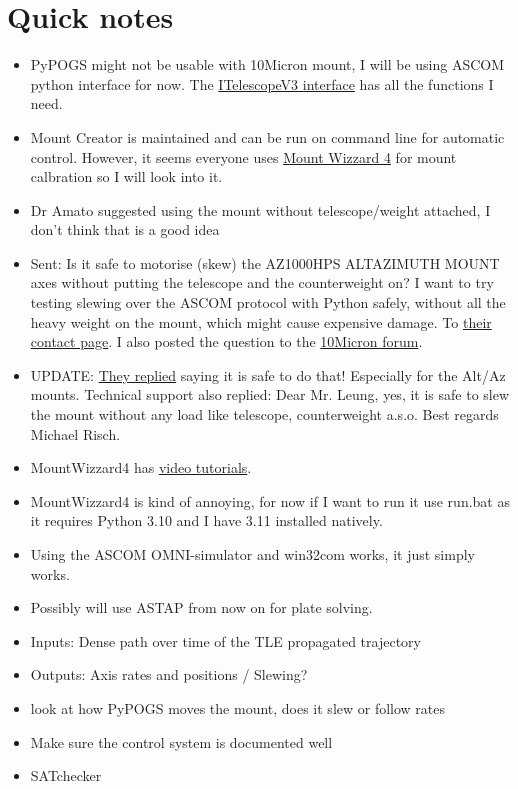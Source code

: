 \documentclass[../main.tex]{subfiles}
\begin{document}
\section{Quick notes}
\begin{itemize}
    \item PyPOGS might not be usable with 10Micron mount, I will be using ASCOM python interface for now. The \href{https://ascom-standards.org/Help/Developer/html/T_ASCOM_DeviceInterface_ITelescopeV3.htm}{ ITelescopeV3 interface} has all the functions I need.
    \item Mount Creator is maintained and can be run on command line for automatic control. However, it seems everyone uses \href{https://mworion.github.io/MountWizzard4/}{Mount Wizzard 4} for mount calbration so I will look into it.
    \item Dr Amato suggested using the mount without telescope/weight attached, I don't think that is a good idea
    \item Sent: Is it safe to motorise (skew) the AZ1000HPS ALTAZIMUTH MOUNT axes without putting the telescope and the counterweight on? I want to try testing slewing over the ASCOM protocol with Python safely, without all the heavy weight on the mount, which might cause expensive damage. To \href{https://10micron.eu/en/contact}{their contact page}. I also posted the question to the \href{https://www.10micron.com/forum/viewtopic.php?f=2&t=2283}{10Micron forum}.
    \item UPDATE: \href{https://www.10micron.com/forum/viewtopic.php?f=2&t=2283&p=19410#p19410}{They replied} saying it is safe to do that! Especially for the Alt/Az mounts. Technical support also replied: Dear Mr. Leung, yes, it is safe to slew the mount without any load like telescope, counterweight a.s.o. Best regards Michael Risch.
    \item MountWizzard4 has \href{https://www.youtube.com/@orion49m/videos}{video tutorials}.
    \item MountWizzard4 is kind of annoying, for now if I want to run it use run.bat as it requires Python 3.10 and I have 3.11 installed natively.
    \item Using the ASCOM OMNI-simulator and win32com works, it just simply works.
    \item Possibly will use ASTAP from now on for plate solving.
\end{itemize}
\begin{itemize}
    \item Inputs: Dense path over time of the TLE propagated trajectory
    \item Outputs: Axis rates and positions / Slewing?
    \item look at how PyPOGS moves the mount, does it slew or follow rates
    \item Make sure the control system is documented well
    \item SATchecker
\end{itemize}
\end{document}
